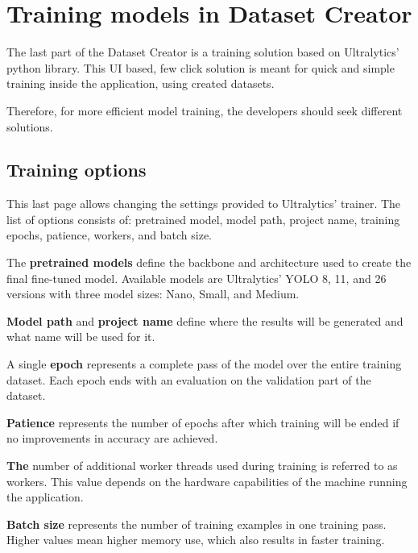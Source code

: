 

\section{Training models in Dataset Creator}
The last part of the Dataset Creator is a training solution based on Ultralytics' python library. This UI based, few click solution is meant for quick and simple training inside the application, using created datasets.

Therefore, for more efficient model training, the developers should seek different solutions.

\subsection{Training options}
This last page allows changing the settings provided to Ultralytics' trainer. The list of options consists of: pretrained model, model path, project name, training epochs, patience, workers, and batch size.

The \textbf{pretrained models} define the backbone and architecture used to create the final fine-tuned model. Available models are Ultralytics' YOLO 8, 11, and 26 versions with three model sizes: Nano, Small, and Medium.

\textbf{Model path} and \textbf{project name} define where the results will be generated and what name will be used for it.

A single \textbf{epoch} represents a complete pass of the model over the entire training dataset. Each epoch ends with an evaluation on the validation part of the dataset.

\textbf{Patience} represents the number of epochs after which training will be ended if no improvements in accuracy are achieved.

\textbf{The} number of additional worker threads used during training is referred to as workers. This value depends on the hardware capabilities of the machine running the application.

\textbf{Batch size} represents the number of training examples in one training pass. Higher values mean higher memory use, which also results in faster training.